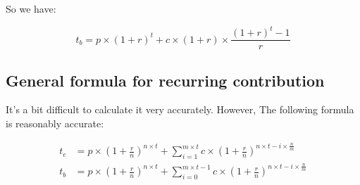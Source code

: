 \documentclass{book}
\begin{document}
	So we have:
	
	\begin{equation*}
		t_b = p \times (1 + r)^t + c \times (1 + r) \times \frac{(1 +r)^t - 1}{r}
	\end{equation*}
	\subsection{General formula for recurring contribution}
	
	It's a bit difficult to calculate it very accurately. However, The following formula is reasonably accurate:
	
	\begin{equation*}
		\begin{split}
		t_e &= p \times (1 + \frac{r}{n})^{n \times t} + \sum_{i = 1}^{m \times t}{c \times (1 + \frac{r}{n})^{n \times t - i \times \frac{n}{m}}} \\
		t_b &= p \times (1 + \frac{r}{n})^{n \times t} + \sum_{i = 0}^{m \times t - 1}{c \times (1 + \frac{r}{n})^{n \times t - i \times \frac{n}{m}}}
		\end{split}
	\end{equation*}
\end{document}
